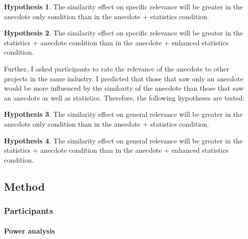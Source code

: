 \documentclass[a4paper, nobind, dvipsnames]{templates/ociamthesis}
\theoremstyle{definition}
\theoremstyle{definition}
\theoremstyle{definition}
\theoremstyle{definition}
\newtheorem{hypothesis}{Hypothesis}[chapter]
\theoremstyle{remark}
\begin{document}
\begin{hypothesis}
\protect\hypertarget{hyp:relevance-specific-anecdotes-1}{}{\label{hyp:relevance-specific-anecdotes-1} }The similarity effect on specific relevance will be greater in the anecdote only
condition than in the anecdote + statistics condition.
\end{hypothesis}

\begin{hypothesis}
\protect\hypertarget{hyp:relevance-specific-enhanced-anecdotes-1}{}{\label{hyp:relevance-specific-enhanced-anecdotes-1} }The similarity effect on specific relevance will be greater in the statistics +
anecdote condition than in the anecdote + enhanced statistics condition.
\end{hypothesis}

Further, I asked participants to rate the relevance of the anecdote to other
projects in the same industry. I predicted that those that saw only an anecdote
would be more influenced by the similarity of the anecdote than those that saw
an anecdote as well as statistics. Therefore, the following hypotheses are
tested:

\begin{hypothesis}
\protect\hypertarget{hyp:relevance-general-anecdotes-1}{}{\label{hyp:relevance-general-anecdotes-1} }The similarity effect on general relevance will be greater in the anecdote only
condition than in the anecdote + statistics condition.
\end{hypothesis}

\begin{hypothesis}
\protect\hypertarget{hyp:relevance-general-enhanced-anecdotes-1}{}{\label{hyp:relevance-general-enhanced-anecdotes-1} }The similarity effect on general relevance will be greater in the statistics +
anecdote condition than in the anecdote + enhanced statistics condition.
\end{hypothesis}

\hypertarget{method-anecdotes-1-appendix}{%
\subsection{Method}\label{method-anecdotes-1-appendix}}

\subsubsection{Participants}

\hypertarget{power-analysis-anecdotes-1}{%
\paragraph{Power analysis}\label{power-analysis-anecdotes-1}}
\end{document}
